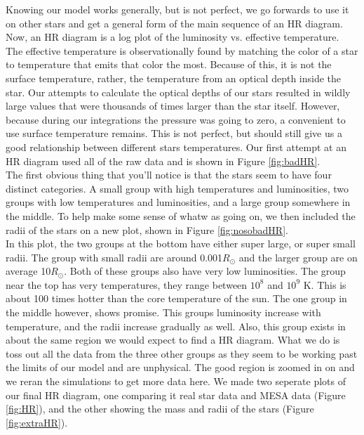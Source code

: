 \documentclass[10pt]{article}
\begin{document}
Knowing our model works generally, but is not perfect, we go forwards to use it on other stars and get a general form of the main sequence of an HR diagram. Now, an HR diagram is a log plot of the luminosity vs. effective temperature. The effective temperature is observationally found by matching the color of a star to temperature that emits that color the most. Because of this, it is not the surface temperature, rather, the temperature from an optical depth inside the star. Our attempts to calculate the optical depths of our stars resulted in wildly large values that were thousands of times larger than the star itself. However, because during our integrations the pressure was going to zero, a convenient to use surface temperature remains. This is not perfect, but should still give us a good relationship between different stars temperatures. Our first attempt at an HR diagram used all of the raw data and is shown in Figure \ref{fig:badHR}. \\

The first obvious thing that you'll notice is that the stars seem to have four distinct categories. A small group with high temperatures and luminosities, two groups with low temperatures and luminosities, and a large group somewhere in the middle. To help make some sense of whatw as going on, we then included the radii of the stars on a new plot, shown in Figure \ref{fig:nosobadHR}. \\

In this plot, the two groups at the bottom have either super large, or super small  radii. The group with small radii are around 0.001$R_\odot$ and the larger group are on average 10$R_\odot$. Both of these groups also have very low luminosities. The group near the top has very temperatures, they range between $10^8$ and $10^9$ K. This is about 100 times hotter than the core temperature of the sun. The one group in the middle however, shows promise. This groups luminosity increase with temperature, and the radii increase gradually as well. Also, this group exists in about the same region we would expect to find a HR diagram. What we do is toss out all the data from the three other groups as they seem to be working past the limits of our model and are unphysical. The good region is zoomed in on and we reran the simulations to get more data here. We made two seperate plots of our final HR diagram, one comparing it real star data and MESA data (Figure \ref{fig:HR}), and the other showing the mass and radii of the stars (Figure \ref{fig:extraHR}). \\
\end{document}
